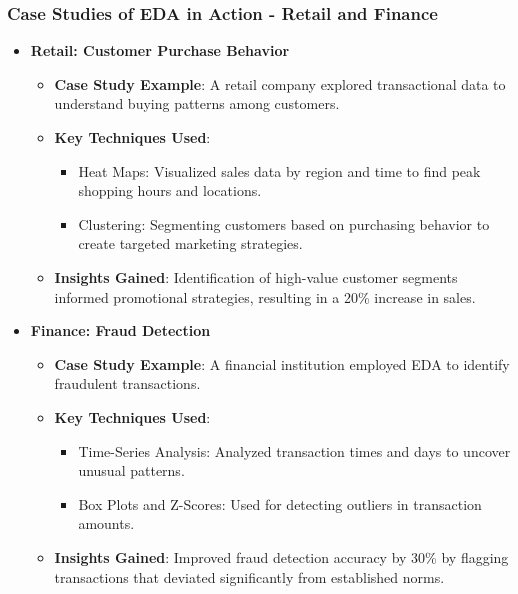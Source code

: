 \documentclass[aspectratio=169]{beamer}
\begin{document}
\begin{frame}[fragile]
    \frametitle{Case Studies of EDA in Action - Retail and Finance}
    \begin{itemize}
        \item \textbf{Retail: Customer Purchase Behavior}
            \begin{itemize}
                \item \textbf{Case Study Example}: A retail company explored transactional data to understand buying patterns among customers.
                \item \textbf{Key Techniques Used}:
                    \begin{itemize}
                        \item Heat Maps: Visualized sales data by region and time to find peak shopping hours and locations.
                        \item Clustering: Segmenting customers based on purchasing behavior to create targeted marketing strategies.
                    \end{itemize}
                \item \textbf{Insights Gained}: Identification of high-value customer segments informed promotional strategies, resulting in a 20\% increase in sales.
            \end{itemize}

        \item \textbf{Finance: Fraud Detection}
            \begin{itemize}
                \item \textbf{Case Study Example}: A financial institution employed EDA to identify fraudulent transactions.
                \item \textbf{Key Techniques Used}:
                    \begin{itemize}
                        \item Time-Series Analysis: Analyzed transaction times and days to uncover unusual patterns.
                        \item Box Plots and Z-Scores: Used for detecting outliers in transaction amounts.
                    \end{itemize}
                \item \textbf{Insights Gained}: Improved fraud detection accuracy by 30\% by flagging transactions that deviated significantly from established norms.
            \end{itemize}
    \end{itemize}
\end{frame}
\end{document}
